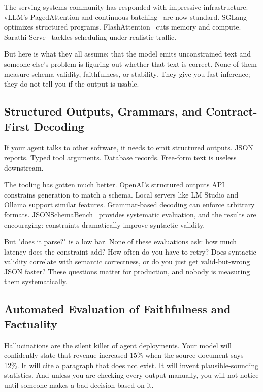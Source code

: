 \documentclass[11pt]{article}
\begin{document}
The serving systems community has responded with impressive infrastructure.
vLLM's PagedAttention and continuous batching~\citep{kwon2023vllm} are now standard.
SGLang~\citep{zheng2023sglang} optimizes structured programs.
FlashAttention~\citep{dao2023flashattention2} cuts memory and compute.
Sarathi-Serve~\citep{agrawal2024sarathi} tackles scheduling under realistic traffic.

But here is what they all assume: that the model emits unconstrained text and someone else's problem is figuring out whether that text is correct.
None of them measure schema validity, faithfulness, or stability.
They give you fast inference; they do not tell you if the output is usable.

\subsection{Structured Outputs, Grammars, and Contract-First Decoding}

If your agent talks to other software, it needs to emit structured outputs.
JSON reports.
Typed tool arguments.
Database records.
Free-form text is useless downstream.

The tooling has gotten much better.
OpenAI's structured outputs API~\citep{openaiStructuredOutputs} constrains generation to match a schema.
Local servers like LM Studio and Ollama support similar features.
Grammar-based decoding can enforce arbitrary formats.
JSONSchemaBench~\citep{geng2025jsonschemabench} provides systematic evaluation, and the results are encouraging: constraints dramatically improve syntactic validity.

But "does it parse?" is a low bar.
None of these evaluations ask: how much latency does the constraint add?
How often do you have to retry?
Does syntactic validity correlate with semantic correctness, or do you just get valid-but-wrong JSON faster?
These questions matter for production, and nobody is measuring them systematically.

\subsection{Automated Evaluation of Faithfulness and Factuality}

Hallucinations are the silent killer of agent deployments.
Your model will confidently state that revenue increased 15\% when the source document says 12\%.
It will cite a paragraph that does not exist.
It will invent plausible-sounding statistics.
And unless you are checking every output manually, you will not notice until someone makes a bad decision based on it.
\end{document}
